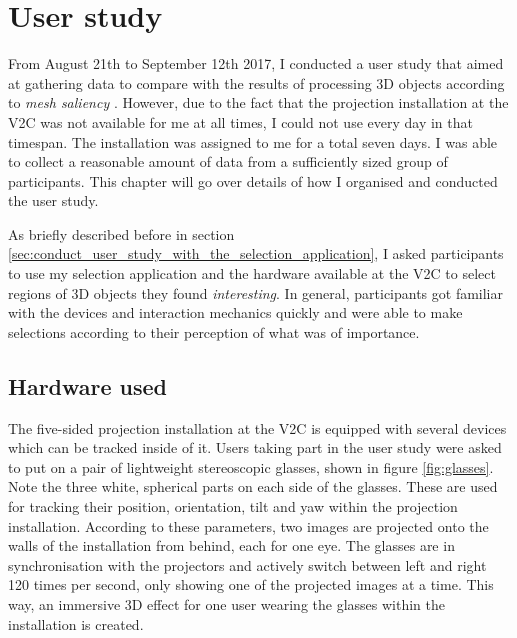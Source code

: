 \chapter{User study}
\label{sec:user_study_chapter}
%
%

From August 21th to September 12th 2017, I conducted a user study that aimed at gathering data to compare with the results of processing 3D objects according to \textit{mesh saliency} \cite{lee2005mesh}. However, due to the fact that the projection installation at the V2C was not available for me at all times, I could not use every day in that timespan. The installation was assigned to me for a total seven days. I was able to collect a reasonable amount of data from a sufficiently sized group of participants. This chapter will go over details of how I organised and conducted the user study.

As briefly described before in section \ref{sec:conduct_user_study_with_the_selection_application}, I asked participants to use my selection application and the hardware available at the V2C to select regions of 3D objects they found \textit{interesting}. In general, participants got familiar with the devices and interaction mechanics quickly and were able to make selections according to their perception of what was of importance.

	\section{Hardware used}
	\label{sec:hardware_used}
%
%

The five-sided projection installation at the V2C is equipped with several devices which can be tracked inside of it. Users taking part in the user study were asked to put on a pair of lightweight stereoscopic glasses, shown in figure \ref{fig:glasses}. Note the three white, spherical parts on each side of the glasses. These are used for tracking their position, orientation, tilt and yaw within the projection installation. According to these parameters, two images are projected onto the walls of the installation from behind, each for one eye. The glasses are in synchronisation with the projectors and actively switch between left and right 120 times per second, only showing one of the projected images at a time. This way, an immersive 3D effect for one user wearing the glasses within the installation is created.  

